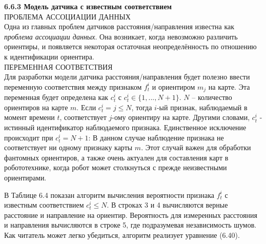 \documentclass[10pt,a4paper]{article}
\begin{document}
\textbf{6.6.3 Модель датчика с известным соответствием}\\

ПРОБЛЕМА АССОЦИАЦИИ ДАННЫХ\\
Одна из главных проблем датчиков расстояния/направления известна как \textit{проблема ассоциации данных}. Она возникает, когда невозможно различить ориентиры, и появляется некоторая остаточная неопределённость по отношению к идентификации ориентира.\\ ПЕРЕМЕННАЯ СООТВЕТСТВИЯ\\ Для разработки модели датчика расстояния/направления будет полезно ввести переменную соответствия между признаком $f_t^i$ и ориентиром $m_j$ на карте. Эта переменная будет определена как $c^i_t$ с $c^i_t\in\{1, . . . , N + 1\}$.
$N$ – количество ориентиров на карте $m$. Если $c^i_t = j\leq N$, тогда $i$-ый признак, наблюдаемый в момент времени $t$, соответствует $j$-ому ориентиру на карте. Другими словами, $c^i_t$ - истинный идентификатор наблюдаемого признака. Единственное исключение происходит при $c^i_t = N + 1$: В данном случае наблюдение признака не соответствует ни одному признаку карты $m$. Этот случай важен для обработки фантомных ориентиров, а также очень актуален для составления карт в робототехнике, когда робот может столкнуться с прежде неизвестными ориентирами.   

В Таблице 6.4 показан алгоритм вычисления вероятности  признака
$f_t^i$ с известным соответствием $c^i_t\leq N$. В строках 3 и 4 вычисляются верные расстояние и направление на ориентир. Вероятность для измеренных расстояния и направления вычисляются в строке 5, где подразумевая независимость шумов.
Как читатель может легко убедиться, алгоритм реализует уравнение (6.40).
\end{document}

